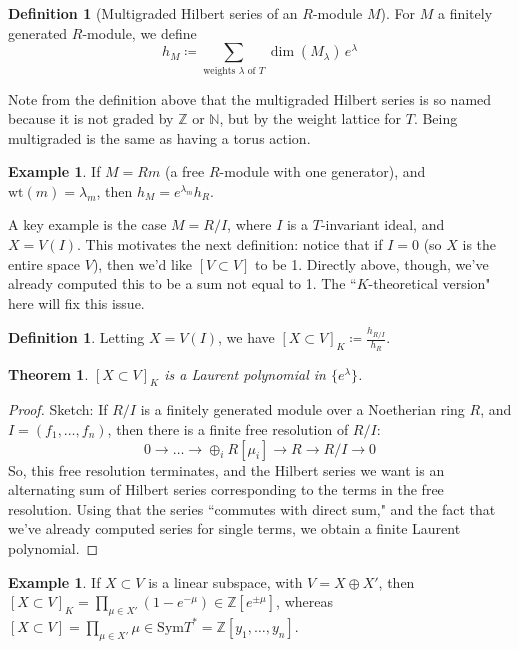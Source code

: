 \documentclass[12pt]{amsart}
\numberwithin{equation}{section}
\newtheorem{Theorem}[equation]{Theorem}
\theoremstyle{definition}
\newtheorem{Example}[equation]{Example}
\newtheorem{Definition}[equation]{Definition}
\numberwithin{figure}{section}
\newcommand{\Z}{\mathbb{Z}}
\begin{document}
\begin{Definition}[Multigraded Hilbert series of an $R$-module $M$]
For $M$ a finitely generated $R$-module, we define 
$$ h_M \coloneqq \sum_{\text{weights } \lambda \text{ of } T} \dim(M_{\lambda}) \, e^{\lambda} $$
\end{Definition} 

Note from the definition above that the multigraded Hilbert series is so named because it is not graded by $\mathbb{Z}$ or $\mathbb{N}$, but by the weight lattice for $T$. Being multigraded is the same as having a torus action.

\begin{Example}
If $M = Rm$ (a free $R$-module with one generator), and $\text{wt}(m) = \lambda_m$, then $h_M = e^{\lambda_m} h_R$.
\end{Example}

A key example is the case $M = R/I$,  where $I$ is a $T$-invariant ideal, and $X = V(I)$. This motivates the next definition: notice that if $I=0$ (so $X$ is the entire space $V$), then we'd like $[V \subset V]$ to be 1. Directly above, though, we've already computed this to be a sum not equal to 1. The ``$K$-theoretical version" here will fix this issue.

\begin{Definition}
Letting $X = V(I)$, we have $[X \subset V]_K \coloneqq \frac{h_{R/I}}{h_R}$.
\end{Definition}

\begin{Theorem}
$[X \subset V]_K$ is a Laurent polynomial in $\{e^{\lambda}\}$.
\end{Theorem}
\begin{proof}
Sketch: If $R/I$ is a finitely generated module over a Noetherian ring $R$, and $I = (f_1, \dots, f_n)$, then there is a finite free resolution of $R/I$:
$$ 0 \to \dots \to \oplus_i R[\mu_i] \to R \to R/I \to 0 $$
So, this free resolution terminates, and the Hilbert series we want is an alternating sum of Hilbert series corresponding to the terms in the free resolution. Using that the series ``commutes with direct sum," and the fact that we've already computed series for single terms, we obtain a finite Laurent polynomial.
\end{proof}

\begin{Example}
If $X \subset V$ is a linear subspace, with $V = X \oplus X'$, then $[X \subset V]_K = \prod_{\mu \in X'}(1-e^{-\mu}) \in \Z[e^{\pm \mu}]$, whereas $[X \subset V] = \prod_{\mu \in X'} \mu \in \text{Sym}T^{\ast} = \Z[y_1, \dots, y_n]$.
\end{Example}
\end{document}
